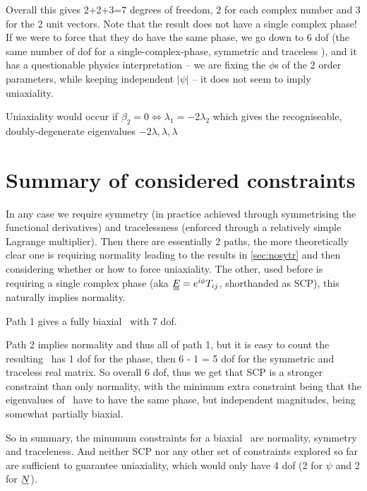 \documentclass[11pt]{article}
\begin{document}
Overall this gives 2+2+3=7 degrees of freedom, 2 for each complex number and 3 for the 2 unit vectors.
Note that the result does not have a single complex phase!
If we were to force that they do have the same phase, we go down to 6 dof (the same number of dof for a single-complex-phase, symmetric and traceless \EE), and it has a questionable physics interpretation -- we are fixing the $\phi$s of the 2 order parameters, while keeping independent $|\psi|$ -- it does not seem to imply uniaxiality.

Uniaxiality would occur if $\beta_2 = 0 \Leftrightarrow \lambda_1 = -2\lambda_2$ which gives the recogniseable, doubly-degenerate eigenvalues $-2\lambda, \lambda, \lambda$

\section{Summary of considered constraints}
In any case we require symmetry (in practice achieved through symmetrising the functional derivatives) and tracelessness (enforced through a relatively simple Lagrange multiplier).
Then there are essentially 2 paths, the more theoretically clear one is requiring normality leading to the results in \cref{sec:nosytr} and then considering whether or how to force uniaxiality.
The other, used before is requiring a single complex phase (aka $\du{E} = e^{i\phi}T_{ij}$, shorthanded as SCP), this naturally implies normality.

Path 1 gives a fully biaxial \EE\ with 7 dof.

Path 2 implies normality and thus all of path 1, but it is easy to count the resulting \EE\ has 1 dof for the phase, then 6 - 1 = 5 dof for the symmetric and traceless real matrix.
So overall 6 dof, thus we get that SCP is a stronger constraint than only normality, with the minimum extra constraint being that the eigenvalues of \EE\ have to have the same phase, but independent magnitudes, being somewhat partially biaxial.

So in summary, the minumum constraints for a biaxial \EE\ are normality, symmetry and traceleness. And neither SCP nor any other set of constraints explored so far are sufficient to guarantee uniaxiality, which would only have 4 dof (2 for $\psi$ and 2 for $\su{N}$).

\newpage
\end{document}
